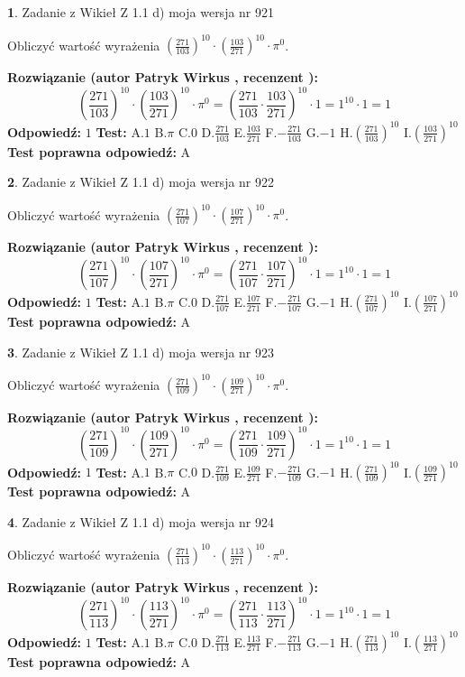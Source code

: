 \documentclass[12pt, a4paper]{article}
\theoremstyle{definition} %
\newtheorem{zad}{}
\newcommand{\zadStart}[1]{\begin{zad}#1\newline}
\newcommand{\zadStop}{\end{zad}}
\newcommand{\rozwStart}[2]{\noindent \textbf{Rozwiązanie (autor #1 , recenzent #2): }\newline}
\newcommand{\rozwStop}{\newline}
\newcommand{\odpStart}{\noindent \textbf{Odpowiedź:}\newline}
\newcommand{\odpStop}{\newline}
\newcommand{\testStart}{\noindent \textbf{Test:}\newline}
\newcommand{\testStop}{\newline}
\newcommand{\kluczStart}{\noindent \textbf{Test poprawna odpowiedź:}\newline}
\newcommand{\kluczStop}{\newline}
\begin{document}
\zadStart{Zadanie z Wikieł Z 1.1 d) moja wersja nr 921}

Obliczyć wartość wyrażenia $(\frac{271}{103})^{10} \cdot (\frac{103}{271})^{10} \cdot \pi^{0}$.
\zadStop
\rozwStart{Patryk Wirkus}{}
$$(\frac{271}{103})^{10} \cdot (\frac{103}{271})^{10} \cdot \pi^{0} = (\frac{271}{103} \cdot \frac{103}{271})^{10} \cdot 1 = 1^{10} \cdot 1 = 1$$
\rozwStop
\odpStart
$1$
\odpStop
\testStart
A.$1$ B.$\pi$ C.$0$ D.$\frac{271}{103}$ E.$\frac{103}{271}$
F.$-\frac{271}{103}$ G.$-1$
H.$(\frac{271}{103})^{10}$
I.$(\frac{103}{271})^{10}$
\testStop
\kluczStart
A
\kluczStop



\zadStart{Zadanie z Wikieł Z 1.1 d) moja wersja nr 922}

Obliczyć wartość wyrażenia $(\frac{271}{107})^{10} \cdot (\frac{107}{271})^{10} \cdot \pi^{0}$.
\zadStop
\rozwStart{Patryk Wirkus}{}
$$(\frac{271}{107})^{10} \cdot (\frac{107}{271})^{10} \cdot \pi^{0} = (\frac{271}{107} \cdot \frac{107}{271})^{10} \cdot 1 = 1^{10} \cdot 1 = 1$$
\rozwStop
\odpStart
$1$
\odpStop
\testStart
A.$1$ B.$\pi$ C.$0$ D.$\frac{271}{107}$ E.$\frac{107}{271}$
F.$-\frac{271}{107}$ G.$-1$
H.$(\frac{271}{107})^{10}$
I.$(\frac{107}{271})^{10}$
\testStop
\kluczStart
A
\kluczStop



\zadStart{Zadanie z Wikieł Z 1.1 d) moja wersja nr 923}

Obliczyć wartość wyrażenia $(\frac{271}{109})^{10} \cdot (\frac{109}{271})^{10} \cdot \pi^{0}$.
\zadStop
\rozwStart{Patryk Wirkus}{}
$$(\frac{271}{109})^{10} \cdot (\frac{109}{271})^{10} \cdot \pi^{0} = (\frac{271}{109} \cdot \frac{109}{271})^{10} \cdot 1 = 1^{10} \cdot 1 = 1$$
\rozwStop
\odpStart
$1$
\odpStop
\testStart
A.$1$ B.$\pi$ C.$0$ D.$\frac{271}{109}$ E.$\frac{109}{271}$
F.$-\frac{271}{109}$ G.$-1$
H.$(\frac{271}{109})^{10}$
I.$(\frac{109}{271})^{10}$
\testStop
\kluczStart
A
\kluczStop



\zadStart{Zadanie z Wikieł Z 1.1 d) moja wersja nr 924}

Obliczyć wartość wyrażenia $(\frac{271}{113})^{10} \cdot (\frac{113}{271})^{10} \cdot \pi^{0}$.
\zadStop
\rozwStart{Patryk Wirkus}{}
$$(\frac{271}{113})^{10} \cdot (\frac{113}{271})^{10} \cdot \pi^{0} = (\frac{271}{113} \cdot \frac{113}{271})^{10} \cdot 1 = 1^{10} \cdot 1 = 1$$
\rozwStop
\odpStart
$1$
\odpStop
\testStart
A.$1$ B.$\pi$ C.$0$ D.$\frac{271}{113}$ E.$\frac{113}{271}$
F.$-\frac{271}{113}$ G.$-1$
H.$(\frac{271}{113})^{10}$
I.$(\frac{113}{271})^{10}$
\testStop
\kluczStart
A
\kluczStop
\end{document}
